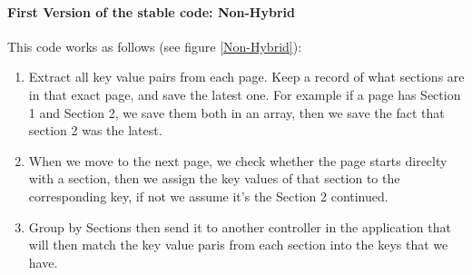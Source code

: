 \documentclass[a4paper,12pt,twoside]{report}
\begin{document}
\paragraph{First Version of the stable code: Non-Hybrid}
This code works as follows (see figure \ref{Non-Hybrid}): 
\begin{enumerate}
\item Extract all key value pairs from each page. Keep a record of what sections are in that exact page, and save the latest one. For example if a page has Section 1 and Section 2, we save them both in an array, then we save the fact that section 2 was the latest. 
\item When we move to the next page, we check whether the page starts direclty with a section, then we assign the key values of that section to the corresponding key, if not we assume it's the Section 2 continued.
\item Group by Sections then send it to another controller in the application that will then match the key value paris from each section into the keys that we have.
\end{enumerate}
\end{document}
